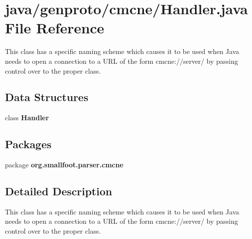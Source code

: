 \section{java/genproto/cmcne/\+Handler.java File Reference}
\label{cmcne_2Handler_8java}


This class has a specific naming scheme which causes it to be used when Java needs to open a connection to a U\+R\+L of the form cmcne\+://server/ by passing control over to the proper class.  


\subsection*{Data Structures}
\begin{DoxyCompactItemize}
\item 
class {\bf Handler}
\end{DoxyCompactItemize}
\subsection*{Packages}
\begin{DoxyCompactItemize}
\item 
package {\bf org.\+smallfoot.\+parser.\+cmcne}
\end{DoxyCompactItemize}


\subsection{Detailed Description}
This class has a specific naming scheme which causes it to be used when Java needs to open a connection to a U\+R\+L of the form cmcne\+://server/ by passing control over to the proper class. 


